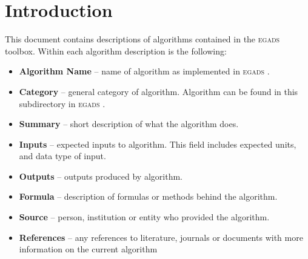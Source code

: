 \documentclass[a4paper,11pt]{report}
\newcommand{\egads}{\textsc{egads} }
\begin{document}
\renewcommand{\thepage}{\roman{page}}






\tableofcontents
\pagebreak


\renewcommand{\thepage}{\arabic{page}}
\setcounter{page}{1}


\chapter{Introduction}

This document contains descriptions of algorithms contained in the \egads toolbox. Within each algorithm description is the following:

\begin{itemize}
\item \textbf{Algorithm Name} -- name of algorithm as implemented in \egads.
\item \textbf{Category} -- general category of algorithm. Algorithm can be found in this subdirectory in \egads.
\item \textbf{Summary} -- short description of what the algorithm does.
\item \textbf{Inputs} -- expected inputs to algorithm. This field includes expected units, and data type of input.
\item \textbf{Outputs} -- outputs produced by algorithm.
\item \textbf{Formula} -- description of formulas or methods behind the algorithm.
\item \textbf{Source} -- person, institution or entity who provided the algorithm.
\item \textbf{References} -- any references to literature, journals or documents with more information on the current algorithm
\end{itemize}
\end{document}
